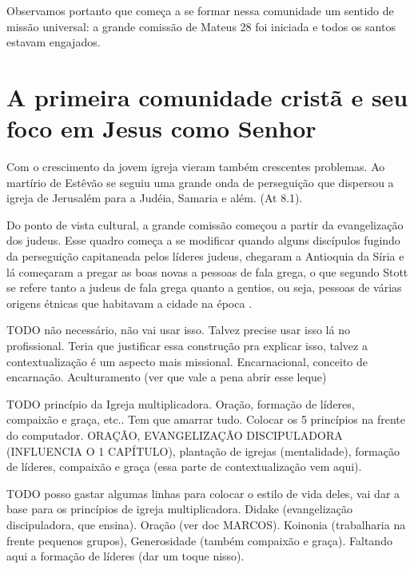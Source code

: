 \documentclass[
	12pt,				%
	openright,			%
	twoside,			%
	a4paper,			%
	english,			%
	french,				%
	spanish,			%
	brazil				%
	]{abntex2}
\begin{document}
Observamos portanto que começa a se formar nessa comunidade um sentido de missão universal: a grande comissão de Mateus 28 foi iniciada e todos os santos estavam engajados.

\section{A primeira comunidade cristã e seu foco em Jesus como Senhor}

Com o crescimento da jovem igreja vieram também crescentes problemas. Ao martírio de Estêvão se seguiu uma grande onda de perseguição que dispersou a igreja de Jerusalém para a Judéia, Samaria e além. (At 8.1).

Do ponto de vista cultural, a grande comissão começou a partir da evangelização dos judeus. Esse quadro começa a se modificar quando alguns discípulos fugindo da perseguição capitaneada pelos líderes judeus, chegaram a Antioquia da Síria e lá começaram a pregar as boas novas a pessoas de fala grega, o que segundo Stott se refere tanto a judeus de fala grega quanto a gentios, ou seja, pessoas de várias origens étnicas que habitavam a cidade na época \cite[184]{stott}.

TODO não necessário, não vai usar isso. Talvez precise usar isso lá no profissional. Teria que justificar essa construção pra explicar isso, talvez a contextualização é um aspecto mais missional. Encarnacional, conceito de encarnação. Aculturamento (ver que vale a pena abrir esse leque)

TODO princípio da Igreja multiplicadora. Oração, formação de líderes, compaixão e graça, etc.. Tem que amarrar tudo. Colocar os 5 princípios na frente do computador. ORAÇÃO, EVANGELIZAÇÃO DISCIPULADORA (INFLUENCIA O 1 CAPÍTULO), plantação de igrejas (mentalidade), formação de líderes, compaixão e graça (essa parte de contextualização vem aqui). 

TODO posso gastar algumas linhas para colocar o estilo de vida deles, vai dar a base para os princípios de igreja multiplicadora. Didake (evangelização discipuladora, que ensina). Oração (ver doc MARCOS). Koinonia (trabalharia na frente pequenos grupos), Generosidade (também compaixão e graça). Faltando aqui a formação de líderes (dar um toque nisso).
\end{document}
